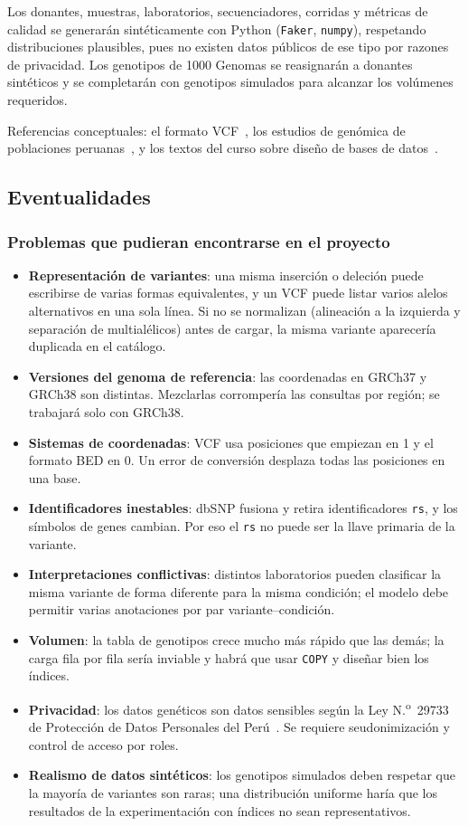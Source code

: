\documentclass[11pt,a4paper]{article}
\newcommand{\tb}[1]{\texttt{#1}}
\begin{document}
Los donantes, muestras, laboratorios, secuenciadores, corridas y métricas de calidad se generarán sintéticamente con Python (\tb{Faker}, \tb{numpy}), respetando distribuciones plausibles, pues no existen datos públicos de ese tipo por razones de privacidad. Los genotipos de 1000 Genomas se reasignarán a donantes sintéticos y se completarán con genotipos simulados para alcanzar los volúmenes requeridos.

Referencias conceptuales: el formato VCF~\cite{vcf}, los estudios de genómica de poblaciones peruanas~\cite{harris}, y los textos del curso sobre diseño de bases de datos~\cite{garcia,elmasri}.

\subsection{Eventualidades}

\subsubsection{Problemas que pudieran encontrarse en el proyecto}

\begin{itemize}
  \item \textbf{Representación de variantes}: una misma inserción o deleción puede escribirse de varias formas equivalentes, y un VCF puede listar varios alelos alternativos en una sola línea. Si no se normalizan (alineación a la izquierda y separación de multialélicos) antes de cargar, la misma variante aparecería duplicada en el catálogo.
  \item \textbf{Versiones del genoma de referencia}: las coordenadas en GRCh37 y GRCh38 son distintas. Mezclarlas corrompería las consultas por región; se trabajará solo con GRCh38.
  \item \textbf{Sistemas de coordenadas}: VCF usa posiciones que empiezan en 1 y el formato BED en 0. Un error de conversión desplaza todas las posiciones en una base.
  \item \textbf{Identificadores inestables}: dbSNP fusiona y retira identificadores \tb{rs}, y los símbolos de genes cambian. Por eso el \tb{rs} no puede ser la llave primaria de la variante.
  \item \textbf{Interpretaciones conflictivas}: distintos laboratorios pueden clasificar la misma variante de forma diferente para la misma condición; el modelo debe permitir varias anotaciones por par variante--condición.
  \item \textbf{Volumen}: la tabla de genotipos crece mucho más rápido que las demás; la carga fila por fila sería inviable y habrá que usar \tb{COPY} y diseñar bien los índices.
  \item \textbf{Privacidad}: los datos genéticos son datos sensibles según la Ley N.\textsuperscript{o}~29733 de Protección de Datos Personales del Perú~\cite{ley29733}. Se requiere seudonimización y control de acceso por roles.
  \item \textbf{Realismo de datos sintéticos}: los genotipos simulados deben respetar que la mayoría de variantes son raras; una distribución uniforme haría que los resultados de la experimentación con índices no sean representativos.
\end{itemize}
\end{document}
